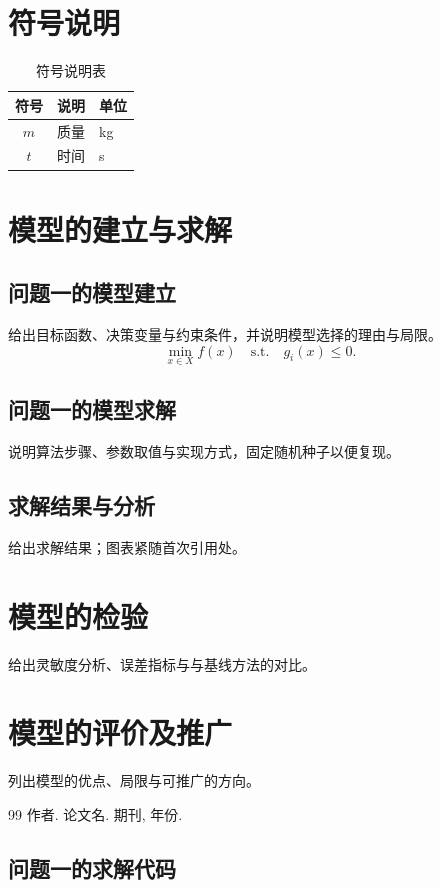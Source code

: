 \documentclass{JXUSTmodeling}
\begin{document}
\section{符号说明}\label{sec:4}
\begin{table}[htbp]
  \centering
  \caption{符号说明表}
  \begin{tabular}{cll}
    \toprule
    符号 & 说明 & 单位 \\
    \midrule
    $m$ & 质量 & kg \\
    $t$ & 时间 & s \\
    \bottomrule
  \end{tabular}
\end{table}

\section{模型的建立与求解}\label{sec:5}
\subsection{问题一的模型建立}
给出目标函数、决策变量与约束条件，并说明模型选择的理由与局限。
\begin{equation}
  \label{eq:objective}
  \min_{x \in X} f(x) \quad \text{s.t.} \quad g_i(x) \le 0 .
\end{equation}

\subsection{问题一的模型求解}
说明算法步骤、参数取值与实现方式，固定随机种子以便复现。

\subsection{求解结果与分析}
给出求解结果；图表紧随首次引用处。

\section{模型的检验}\label{sec:6}
给出灵敏度分析、误差指标与与基线方法的对比。

\section{模型的评价及推广}\label{sec:7}
列出模型的优点、局限与可推广的方向。

\begin{thebibliography}{99}
   作者. 论文名. 期刊, 年份.
\end{thebibliography}

\begin{appendixx}
  \section{问题一的求解代码}
\end{appendixx}
\end{document}
